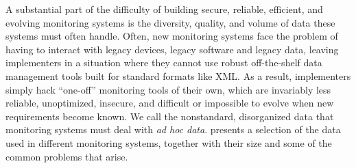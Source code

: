 \documentclass{sigplanconf}
\begin{document}
A substantial part of the difficulty of building secure, reliable, efficient,
and evolving monitoring systems is the diversity, quality, and volume of data
these systems must often handle.  Often, new monitoring
systems face the problem of having to interact with legacy devices,
legacy software and legacy data, leaving implementers in a situation
where they cannot use robust off-the-shelf data management tools built for
standard formats like XML.  As a result, implementers simply
hack ``one-off'' monitoring tools of their own, which are invariably
less reliable, unoptimized, insecure, and difficult or impossible to evolve
when new requirements become known.  
We call the nonstandard, disorganized data that monitoring systems
must deal with {\em ad hoc data}.   presents 
a selection of the data used in different monitoring systems, together 
with their size and some of the common problems that arise.


\end{document}
